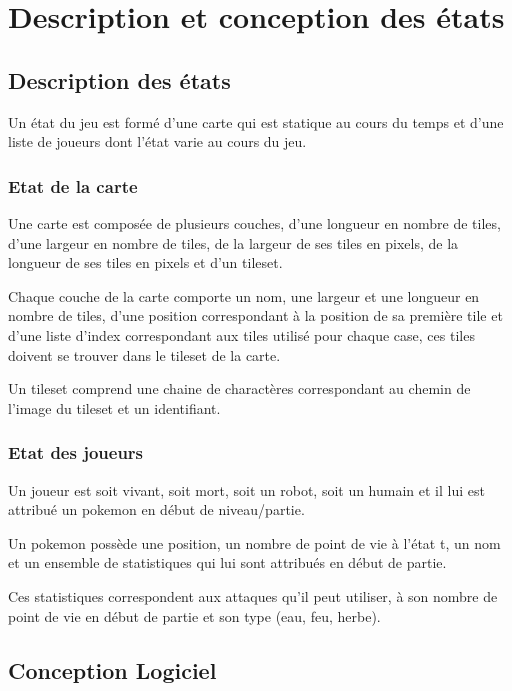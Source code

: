 \documentclass[a4paper,12pt]{article}
\begin{document}
    \clearpage
    \section{Description et conception des états}

    \subsection{Description des états}
    Un état du jeu est formé d'une carte qui est statique au cours du temps et d'une liste de joueurs dont l'état varie au cours du jeu.

    \subsubsection{Etat de la carte}
    Une carte est composée de plusieurs couches, d'une longueur en nombre de tiles, d'une largeur en nombre de tiles, de la largeur de ses tiles en pixels, de la longueur de ses tiles en pixels et d'un tileset.

    Chaque couche de la carte comporte un nom, une largeur et une longueur en nombre de tiles, d'une position correspondant à la position de sa première tile et d'une liste d'index correspondant aux tiles utilisé pour chaque case, ces tiles doivent se trouver dans le tileset de la carte.

    Un tileset comprend une chaine de charactères correspondant au chemin de l'image du tileset et un identifiant.

    \subsubsection{Etat des joueurs}
    Un joueur est soit vivant, soit mort, soit un robot, soit un humain et il lui est attribué un pokemon en début de niveau/partie.

    Un pokemon possède une position, un nombre de point de vie à l'état t, un nom et un ensemble de statistiques qui lui sont attribués en début de partie.

    Ces statistiques correspondent aux attaques qu'il peut utiliser, à son nombre de point de vie en début de partie et son type (eau, feu, herbe).
    \subsection{Conception Logiciel}


\end{document}
